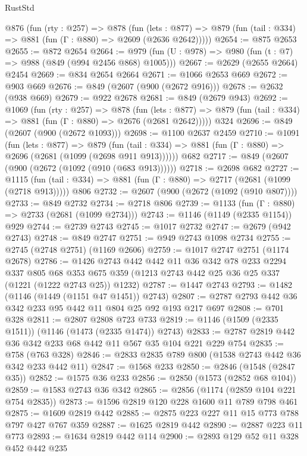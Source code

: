 \begin{lexlean}{RustStd}
\begin{coremodule}
  @876
    (fun (rty : @257) =>
    @878
      (fun (lets : @877) =>
      @879 (fun (tail : @334) => @881 (fun (Γ : @880) => @2609 (@2636 @2642)))))
@2654 := @875 @2653
@2655 := @872 @2654
@2664 := @979 (fun (U : @978) => @980 (fun (t : @7) => @988 (@849 (@994 @2456 @868) @1005)))
@2667 := @2629 (@2655 @2664) @2454
@2669 := @834 @2654 @2664
@2671 := @1066 @2653 @669
@2672 := @903 @669
@2676 := @849 (@2607 (@900 (@2672 @916)))
@2678 := @2632 (@938 @669)
@2679 := @922 @2678
@2681 := @849 (@2679 @943)
@2692 := @1069
    (fun (rty : @257) =>
    @878
      (fun (lets : @877) =>
      @879 (fun (tail : @334) => @881 (fun (Γ : @880) => @2676 (@2681 @2642)))))
    @324
@2696 := @849 (@2607 (@900 (@2672 @1093)))
@2698 := @1100 @2637 @2459
@2710 := @1091
    (fun (lets : @877) =>
    @879 (fun (tail : @334) => @881 (fun (Γ : @880) => @2696 (@2681 (@1099 (@2698 @911 @913))))))
    @682
@2717 := @849 (@2607 (@900 (@2672 (@1092 (@910 (@683 @913))))))
@2718 := @2698 @682
@2727 := @1115
    (fun (tail : @334) => @881 (fun (Γ : @880) => @2717 (@2681 (@1099 (@2718 @913)))))
    @806
@2732 := @2607 (@900 (@2672 (@1092 (@910 @807))))
@2733 := @849 @2732
@2734 := @2718 @806
@2739 := @1133 (fun (Γ : @880) => @2733 (@2681 (@1099 @2734)))
@2743 := @1146 (@1149 (@2335 @1154)) @929
@2744 := @2739 @2743
@2745 := @1017 @2732
@2747 := @2679 (@942 @2743)
@2748 := @849 @2747
@2751 := @949 @2743 @1098 @2734
@2755 := @2745 (@2748 @2751) (@1169 @2606)
@2759 := @1017 @2747 @2751 (@1174 @2678)
@2786 := @1426
    @2743
    @442
    @442
    @11
    @36
    @342
    @78
    @233
    @2294
    @337
    @805
    @68
    @353
    @675
    @359
    (@1213 @2743 @442 @25 @36 @25 @337 (@1221 (@1222 @2743 @25)) @1232)
@2787 := @1447 @2743
@2793 := @1482 (@1146 (@1449 (@1151 @47 @1451)) @2743)
@2807 := @2787 @2793 @442 @36 @342 @233 @95 @442 @11 @804 @25 @92 @193 @217 @697
@2808 := @701 @328
@2811 := @2807 @2808 @723 @733
@2819 := @1146 (@1509 (@2335 @1511)) (@1146 (@1473 (@2335 @1474)) @2743)
@2833 := @2787 @2819 @442 @36 @342 @233 @68 @442 @11 @567 @35 @104 @221 @229 @754
@2835 := @758 (@763 @328)
@2846 := @2833 @2835 @789 @800 (@1538 @2743 @442 @36 @342 @233 @442 @11)
@2847 := @1568 @233
@2850 := @2846 (@1548 (@2847 @35))
@2852 := @1575 @36 @233
@2856 := @2850 (@1573 (@2852 @68 @104))
@2859 := @1583 @2743 @36 @342
@2865 := @2856 (@1174 (@2859 @104 @221 @754 @2835))
@2873 := @1596 @2819 @120 @228 @1600 @11 @789 @798 @461
@2875 := @1609 @2819 @442
@2885 := @2875 @223 @227 @11 @15 @773 @788 @797 @427 @767 @359
@2887 := @1625 @2819 @442
@2890 := @2887 @223 @11 @773
@2893 := @1634 @2819 @442 @114
@2900 := @2893 @129 @52 @11 @328 @452 @442 @235

\end{coremodule}
\end{lexlean}
